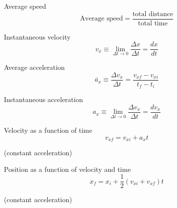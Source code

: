 \documentclass[avery5371]{flashcards}
\begin{document}
\begin{flashcard}[Chapter 2]{Average speed}
\bigskip
\bigskip
\begin{displaymath}
\textrm{Average speed} = \frac{\textrm{total distance}}{\textrm{total time}}
\end{displaymath}
\end{flashcard}

\begin{flashcard}[Chapter 2]{Instantaneous velocity}
\bigskip
\bigskip
\begin{displaymath}
v_{x} \equiv \lim_{\Delta t \rightarrow 0} \frac{\Delta x}{\Delta t} = \frac{dx}{dt}
\end{displaymath}
\end{flashcard}

\begin{flashcard}[Chapter 2]{Average acceleration}
\bigskip
\bigskip
\begin{displaymath}
\bar{a}_{x} \equiv \frac{\Delta v_{x}}{\Delta t} = \frac{v_{xf} - v_{xi}}{t_{f} - t_{i}}
\end{displaymath}
\end{flashcard}

\begin{flashcard}[Chapter 2]{Instantaneous acceleration}
\bigskip
\bigskip
\begin{displaymath}
a_{x} \equiv \lim_{\Delta t \rightarrow 0} \frac{\Delta v_{x}}{\Delta t} = \frac{dv_{x}}{dt}
\end{displaymath}
\end{flashcard}

\begin{flashcard}[Chapter 2]{Velocity as a function of time}
\bigskip
\begin{displaymath}
v_{xf} = v_{xi} + a_{x}t
\end{displaymath}
\begin{center}
(constant acceleration)
\end{center}
\end{flashcard}

\begin{flashcard}[Chapter 2]{Position as a function of velocity and time}
\bigskip
\begin{displaymath}
x_{f} = x_{i} + \frac{1}{2}\left( v_{xi} + v_{xf}\right)t
\end{displaymath}
\begin{center}
(constant acceleration)
\end{center}
\end{flashcard}
\end{document}

